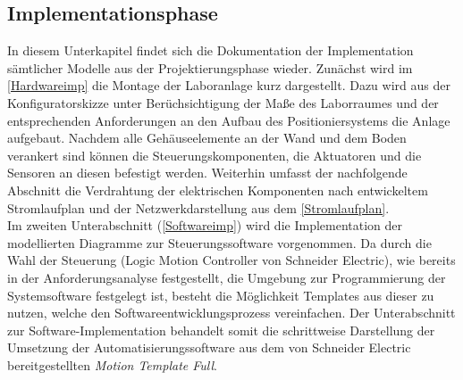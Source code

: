 \documentclass[../../../Bachelorarbeit.tex]{subfiles}
\begin{document}
\subsection{Implementationsphase} \label{implementation}
In diesem Unterkapitel findet sich die Dokumentation der Implementation sämtlicher Modelle aus der Projektierungsphase wieder. Zunächst wird im \autoref{Hardwareimp} die Montage der Laboranlage kurz dargestellt. Dazu wird aus der Konfiguratorskizze unter Berüchsichtigung der Maße des Laborraumes und der entsprechenden Anforderungen an den Aufbau des Positioniersystems die Anlage aufgebaut. Nachdem alle Gehäuseelemente an der Wand und dem Boden verankert sind können die Steuerungskomponenten, die Aktuatoren und die Sensoren an diesen befestigt werden. Weiterhin umfasst der nachfolgende Abschnitt die Verdrahtung der elektrischen Komponenten nach entwickeltem Stromlaufplan und der Netzwerkdarstellung aus dem \autoref{Stromlaufplan}.\\
Im zweiten Unterabschnitt (\autoref{Softwareimp}) wird die Implementation der modellierten Diagramme zur Steuerungssoftware vorgenommen. Da durch die Wahl der Steuerung (Logic Motion Controller von Schneider Electric), wie bereits in der Anforderungsanalyse festgestellt, die Umgebung zur Programmierung der Systemsoftware festgelegt ist, besteht die Möglichkeit Templates aus dieser zu nutzen, welche den Softwareentwicklungsprozess vereinfachen. Der Unterabschnitt zur Software-Implementation behandelt somit die schrittweise Darstellung der Umsetzung der Automatisierungssoftware aus dem von Schneider Electric bereitgestellten \textit{Motion Template Full}.
\end{document}
